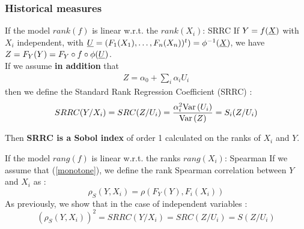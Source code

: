 \documentclass[8pt]{beamer}
\begin{document}
 
 
 

\begin{frame}
\frametitle{Historical measures}
 \small
  
 \begin{block}{If the model $rank(f)$ is  linear w.r.t. the $rank(X_i)$: SRRC}
   If $Y = f({\underline{X}})$ with \alert{$X_i$ independent}, with ${\underline{U}} = (F_1(X_1), \dots, F_n(X_n))^t) = \phi^{-1}({\underline{X}})$, we have $ Z = F_Y(Y) = F_Y \circ f \circ \phi ({\underline{U}})$. \\
   

 If we assume  {\bf in addition} that
    \alert{\begin{align}\label{monotone}
           Z = \alpha_0 +\sum_i \alpha_i U_i
           \end{align}
           }
       then we define the  \alert{ Standard Rank Regression Coefficient (SRRC)} :
          $$
     SRRC(Y/X_i) = SRC(Z / U_i) = \dfrac{\alpha_i^2 \mbox{Var}\left( U_i \right)}{\mbox{Var}\left( Z \right)} = S_i(Z/U_i)
    $$    
       
    Then {\bf SRRC is a Sobol index} of order 1 calculated on the ranks of $X_i$ and $Y$.
           
  \end{block} 

   
 \begin{block}{If the model $rang(f)$ is  linear w.r.t. the ranks $rang(X_i)$: Spearman}
  If we assume that (\ref{monotone}), we define the \alert{ rank Spearman correlation} between $Y$ and $X_i$ as :
  $$
 \rho_S(Y,X_i) = \rho(F_Y(Y),F_i(X_i))
  $$
  As previously, we show that in the case of  \alert{independent variables} :
  $$
  (\rho_S(Y,X_i))^2 = SRRC(Y/X_i) = SRC(Z / U_i) = S(Z/U_i)
  $$
 
\end{block}
 \end{frame}
\end{document}
